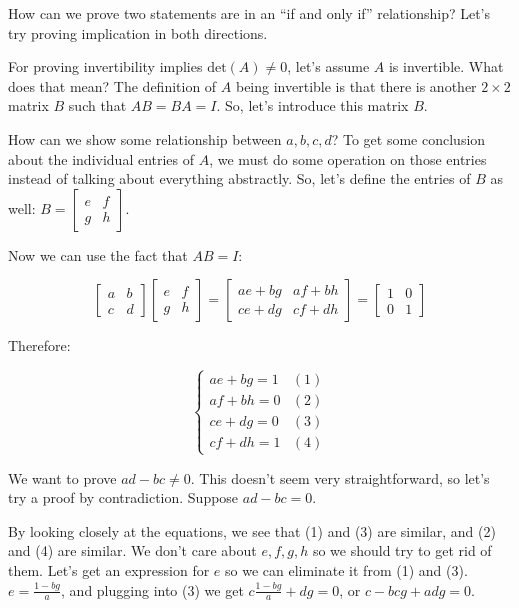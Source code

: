 \documentclass[11pt]{article}
\begin{document}
    How can we prove two statements are in an ``if and only if'' relationship? Let's try
    proving implication in both directions.
    
    For proving invertibility implies $\mathrm{det}(A)\neq0$, let's assume $A$ is
    invertible. What does that mean? The definition of $A$ being invertible is that
    there is another $2\times2$ matrix $B$ such that $AB=BA=I$. So, let's introduce
    this matrix $B$.
    
    How can we show some relationship between $a,b,c,d$? To get some conclusion about
    the individual entries of $A$, we must do some operation on those entries instead
    of talking about everything abstractly. So, let's define the entries of $B$ as well:
    $B=\begin{bmatrix}e & f \\ g & h\end{bmatrix}$.
    
    Now we can use the fact that $AB=I$:
    
    $$\begin{bmatrix}a & b \\ c & d\end{bmatrix}\begin{bmatrix}e & f \\ g & h\end{bmatrix}
    =\begin{bmatrix}ae+bg & af+bh \\ ce+dg & cf+dh\end{bmatrix}
    =\begin{bmatrix}1 & 0 \\ 0 & 1\end{bmatrix}$$
    
    Therefore:
    
    $$\begin{cases}
    ae+bg=1 & (1) \\
    af+bh=0 & (2) \\
    ce+dg=0 & (3) \\
    cf+dh=1 & (4)
    \end{cases}$$
    
    We want to prove $ad-bc\neq0$. This doesn't seem very straightforward, so let's try
    a proof by contradiction. Suppose $ad-bc=0$.
    
    By looking closely at the equations, we see that (1) and (3) are similar, and (2)
    and (4) are similar. We don't care about $e,f,g,h$ so we should try to get rid of them.
    Let's get an expression for $e$ so we can eliminate it from (1) and (3).
    $e=\frac{1-bg}a$, and plugging into (3) we get $c\frac{1-bg}a+dg=0$, or
    $c-bcg+adg=0$.
    
\end{document}
